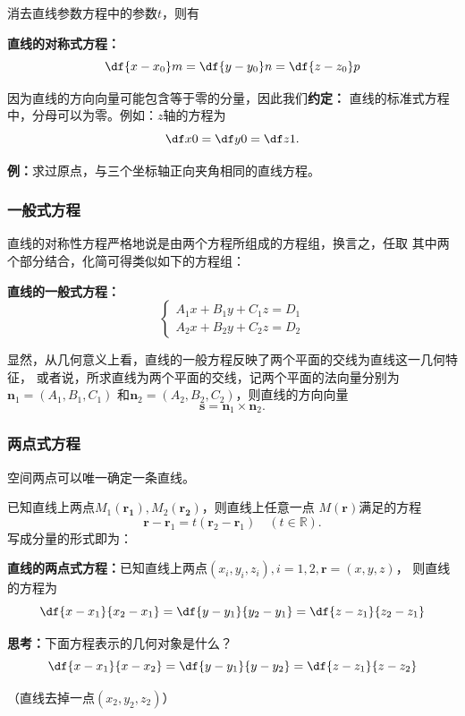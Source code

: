 消去直线参数方程中的参数$t$，则有

\begin{thx}
	{\bf 直线的对称式方程：}
	$$\df{x-x_0}m=\df{y-y_0}n=\df{z-z_0}p$$
\end{thx}

因为直线的方向向量可能包含等于零的分量，因此我们{\bf 约定：}
{\kaishu 直线的标准式方程中，分母可以为零}。例如：$z$轴的方程为
$$\df x0=\df y0=\df z1.$$

{\bf 例：}求过原点，与三个坐标轴正向夹角相同的直线方程。

\subsubsection{一般式方程}

直线的对称性方程严格地说是由两个方程所组成的方程组，换言之，任取
其中两个部分结合，化简可得类似如下的方程组：
\begin{thx}
	{\bf 直线的一般式方程：}
	$$
		\left\{\begin{array}{l}
			A_1x+B_1y+C_1z=D_1\\
			A_2x+B_2y+C_2z=D_2
		\end{array}\right.
	$$
\end{thx}

显然，从几何意义上看，直线的一般方程反映了两个平面的交线为直线这一几何特征，
或者说，所求直线为两个平面的交线，记两个平面的法向量分别为$\bm{n}_1=(A_1,B_1,C_1)$
和$\bm{n}_2=(A_2,B_2,C_2)$，则直线的方向向量
$$\bm{s}=\bm{n}_1\times\bm{n}_2.$$

\subsubsection{两点式方程}

空间两点可以唯一确定一条直线。

已知直线上两点$M_1(\bm{r_1}),M_2(\bm{r_2})$，则直线上任意一点
$M(\bm{r})$满足的方程
$${\bm{r}-\bm{r}_1=t(\bm{r}_2-\bm{r}_1)\quad (t\in\mathbb{R})}.$$ 
写成分量的形式即为：

\begin{thx}
	{\bf 直线的两点式方程：}已知直线上两点$(x_i,y_i,z_i),i=1,2,\bm{r}=(x,y,z)$，
	则直线的方程为
	$$\df{x-x_1}{x_2-x_1}=\df{y-y_1}{y_2-y_1}=\df{z-z_1}{z_2-z_1}$$
\end{thx}

{\bf 思考：}下面方程表示的几何对象是什么？
$${\df{x-x_1}{x-x_2}=\df{y-y_1}{y-y_2}=\df{z-z_1}{z-z_2}}$$

\hfill （直线去掉一点$(x_2,y_2,z_2)$）

